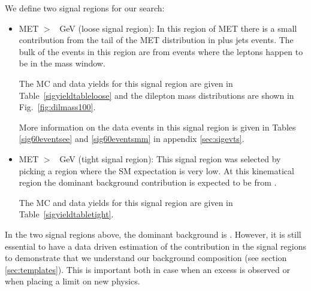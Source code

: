 We define two signal regions for our search:

\begin{itemize}
\item MET $>$ \signalmetl~GeV (loose signal region):
  In this region of MET there is a small contribution from the tail of the MET distribution 
  in \Z plus jets events. 
  The bulk of the events in this region are from \ttbar events where the leptons happen to be in the \Z 
  mass window.


  The MC and data yields for this signal region are given in Table~\ref{sigyieldtableloose} and the dilepton
  mass distributions are shown in Fig.~\ref{fig:dilmass100}.


  More information on the data events in this signal region is given in Tables \ref{sig60eventsee}
  and \ref{sig60eventsmm} in appendix \ref{sec:sigevts}.

\item MET $>$ \signalmett~GeV (tight signal region):
  This signal region was selected by picking a region where the SM 
  expectation is very low.
  At this kinematical region the dominant background contribution is expected to be from \ttbar.

  The MC and data yields for this signal region are given in Table~\ref{sigyieldtabletight}.

\end{itemize}

In the two signal regions above, the dominant background is \ttbar. 
However, it is still essential to have a data driven estimation of the \Z contribution
in the signal regions to demonstrate that we understand our background composition (see section \ref{sec:templates}).
This is important both in case when an excess is observed or when placing a limit on new physics.

